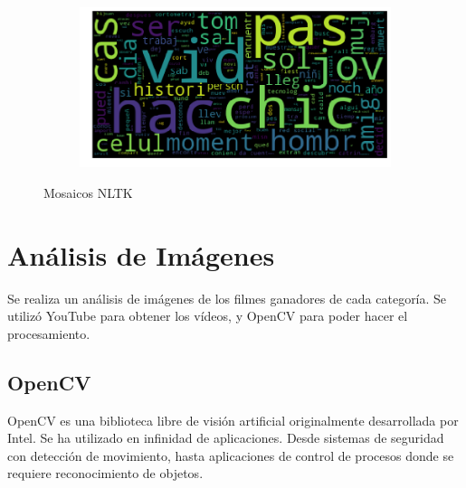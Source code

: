 \documentclass[5p,times]{elsarticle}
\begin{document}
\begin{figure}[H]
\begin{subfigure}[t]{0.2375\textwidth}
\caption{}
\end{subfigure}
\hfill
\begin{subfigure}[t]{0.2375\textwidth}
\includegraphics[width=\textwidth]{21}
\caption{}
\end{subfigure}
\caption{Mosaicos NLTK}\label{fig:NLTK}
\end{figure}



\section*{Análisis de Imágenes}

Se realiza un análisis de imágenes de los filmes ganadores de cada categoría. Se utilizó YouTube para obtener los vídeos, y OpenCV para poder hacer el procesamiento.

\subsection*{OpenCV}

OpenCV es una biblioteca libre de visión artificial originalmente desarrollada por Intel. Se ha utilizado en infinidad de aplicaciones. Desde sistemas de seguridad con detección de movimiento, hasta aplicaciones de control de procesos donde se requiere reconocimiento de objetos.
\end{document}

